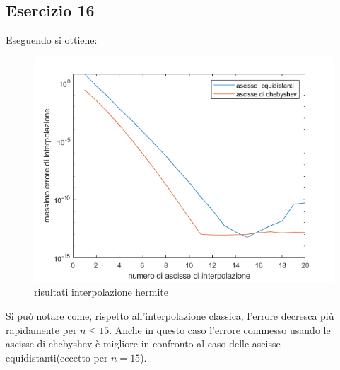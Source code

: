 \newpage
\subsection{Esercizio 16}
Eseguendo  si ottiene:
\begin{figure}[h!]
    \includegraphics[scale=0.8]{capitolo4/hermite.png}
    \caption{risultati interpolazione hermite}
    \label{fig:16}
\end{figure}


Si può notare come, rispetto all'interpolazione classica, l'errore decresca più rapidamente per $n \le 15$. Anche in questo caso l'errore commesso usando le ascisse di chebyshev
è migliore in confronto al caso delle ascisse equidistanti(eccetto per $n=15$).